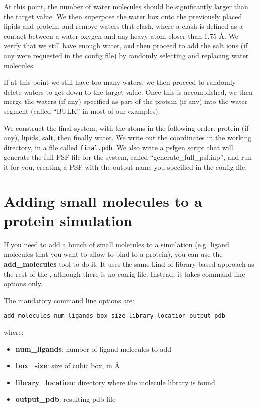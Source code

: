 \documentclass[12pt]{article}
\begin{document}
At this point, the number of water molecules should be significantly larger
than the target value.  We then superpose the water box onto the previously
placed lipids and protein, and remove waters that clash, where a clash is
defined as a contact between a water oxygen and any heavy atom closer than 1.75
{\AA}.  We verify that we still have enough water, and then proceed to add
the salt ions (if any were requested in the config file) by randomly
selecting and replacing water molecules.

If at this point we still have too many waters, we then proceed to randomly
delete waters to get down to the target value.  Once this is accomplished, we
then merge the waters (if any) specified as part of the protein (if any) into
the water segment (called ``BULK'' in most of our examples).

We construct the final system, with the atoms in the following order: protein
(if any), lipids, salt, then finally water.  We write out the coordinates in
the working directory, in a file called {\tt final.pdb}.  We also write a
psfgen script that will generate the full PSF file for the system, called
``generate\_full\_psf.inp'', and run it for you, creating a PSF with the
output name you specified in the config file.

\section{Adding small molecules to a protein simulation}

If you need to add a bunch of small molecules to a simulation (e.g. ligand
molecules that you want to allow to bind to a protein), you can use the {\bf
add\_molecules} tool to do it.  It uses the same kind of library-based
approach as the rest of the {\omgwtf}, although there is no config file.
Instead, it takes command line options only.

The mandatory command line options are:

{\tt add\_molecules num\_ligands box\_size library\_location output\_pdb}

where:
\begin{itemize}
    \item {\bf num\_ligands}: number of ligand molecules to add
    \item {\bf box\_size}: size of cubic box, in {\AA}
    \item {\bf library\_location}: directory where the molecule library is found
    \item {\bf output\_pdb}: resulting pdb file
\end{itemize}
\end{document}
